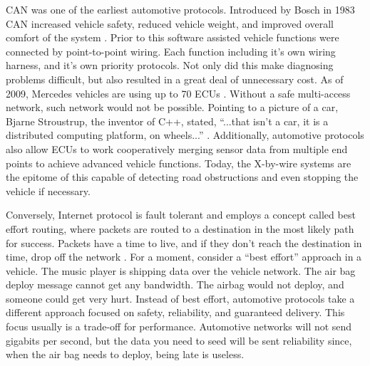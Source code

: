\documentclass[conference,12pt]{IEEEtran}
\begin{document}
CAN was one of the earliest automotive protocols.  Introduced by Bosch in 1983
\autocite{std_can} CAN increased vehicle safety, reduced vehicle weight, and
improved overall comfort of the system \autocite{navet_trends_2005}. Prior to
this software
assisted vehicle functions were connected by point-to-point wiring.  Each
function including it's own wiring harness, and it's own priority protocols.
Not only did this make diagnosing problems difficult, but also resulted in a great deal of
unnecessary cost. As of 2009, Mercedes vehicles are using up to 70 ECUs
\autocite{guo_integrated_2009}. Without a safe multi-access network, such
network would not be possible.  Pointing to a picture of a car, Bjarne
Stroustrup, the inventor of C++, stated, ``...that isn't a car, it is
a distributed computing platform, on wheels...''
\autocite{going_native_keynote_bjarne}.  Additionally, automotive protocols also allow ECUs to work
cooperatively merging sensor data from multiple end points to achieve advanced
vehicle functions. Today, the X-by-wire systems are the epitome of this capable
of detecting road obstructions and even stopping the vehicle if necessary.  

Conversely, Internet protocol is fault
tolerant and employs a concept called best effort routing, where packets are
routed to a destination in the most likely path for success.  Packets have
a time to live, and if they don't reach the destination in time, drop off the
network \autocite{_best-effort_2014}. For a moment, consider a ``best effort'' approach in a vehicle. 
The music
player is shipping data over the vehicle network. The air bag deploy message
cannot get any bandwidth. The airbag would not deploy, and someone could get
very hurt. Instead of best effort, automotive
protocols take a different approach focused on safety, reliability, and
guaranteed delivery. This focus usually is a trade-off for performance.
Automotive networks will not send gigabits per second, but the data you need to
seed will be sent reliability since, when the air bag needs to deploy, being late is useless.
\end{document}

